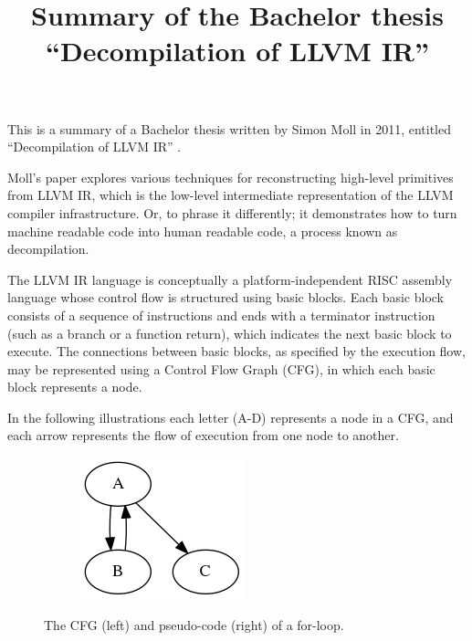 \documentclass[12pt, a4paper]{article}
\title{Summary of the Bachelor thesis ``Decompilation of LLVM IR''}
\begin{document}
\maketitle

This is a summary of a Bachelor thesis written by Simon Moll in 2011, entitled ``Decompilation of LLVM IR'' \cite{decomp_llvm}.

Moll's paper explores various techniques for reconstructing high-level primitives from LLVM IR, which is the low-level intermediate representation of the LLVM compiler infrastructure. Or, to phrase it differently; it demonstrates how to turn machine readable code into human readable code, a process known as decompilation.

The LLVM IR language is conceptually a platform-independent RISC assembly language whose control flow is structured using basic blocks. Each basic block consists of a sequence of instructions and ends with a terminator instruction (such as a branch or a function return), which indicates the next basic block to execute. The connections between basic blocks, as specified by the execution flow, may be represented using a Control Flow Graph (CFG), in which each basic block represents a node.

In the following illustrations each letter (A-D) represents a node in a CFG, and each arrow represents the flow of execution from one node to another.

\begin{figure}[H]
   \centering
   \begin{subfigure}[b]{0.2\textwidth}
      \includegraphics[width=\textwidth]{inc/for-loop.png}
   \end{subfigure}
   \qquad
   \begin{subfigure}[b]{0.2\textwidth}
      
   \end{subfigure}
   \caption{The CFG (left) and pseudo-code (right) of a for-loop.}
\end{figure}
\end{document}
